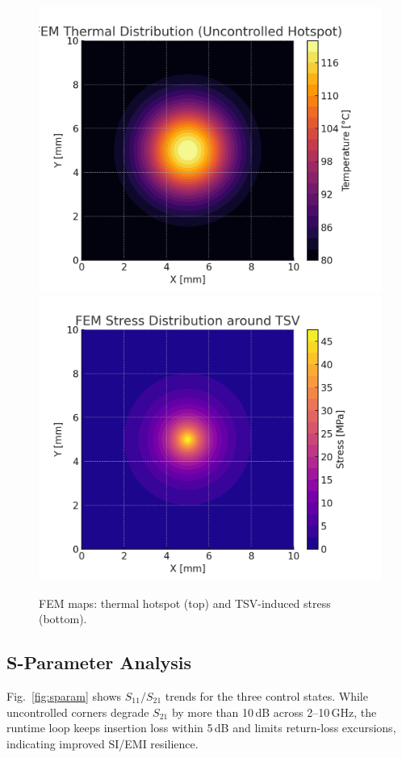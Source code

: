 \documentclass[conference]{IEEEtran}
\begin{document}
\begin{figure}[t]
\centering
\includegraphics[width=0.95\linewidth]{figs/fem_thermal_map.png}\\[3pt]
\includegraphics[width=0.95\linewidth]{figs/fem_stress_map.png}
\caption{FEM maps: thermal hotspot (top) and TSV-induced stress (bottom).}
\label{fig:fem}
\end{figure}

\subsection{S-Parameter Analysis}
Fig.~\ref{fig:sparam} shows $S_{11}/S_{21}$ trends for the three control states. While uncontrolled corners degrade $S_{21}$ by more than 10\,dB across 2--10\,GHz, the runtime loop keeps insertion loss within 5\,dB and limits return-loss excursions, indicating improved SI/EMI resilience.
\end{document}
